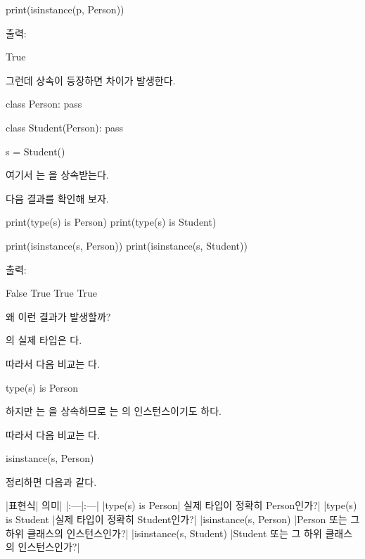 \begin{dhkcode}
print(isinstance(p, Person))
\end{dhkcode}

출력:

\begin{dhkzsh}
True
\end{dhkzsh}

그런데 상속이 등장하면 차이가 발생한다.

\begin{dhkcode}
class Person:
    pass

class Student(Person):
    pass

s = Student()
\end{dhkcode}

여기서 는 을 상속받는다.

다음 결과를 확인해 보자.

\begin{dhkcode}
print(type(s) is Person)
print(type(s) is Student)

print(isinstance(s, Person))
print(isinstance(s, Student))
\end{dhkcode}

출력:

\begin{dhkzsh}
False
True
True
True
\end{dhkzsh}

왜 이런 결과가 발생할까?

의 실제 타입은 다.

따라서 다음 비교는 다.

\begin{dhkcode}
type(s) is Person
\end{dhkcode}

하지만 는 을 상속하므로 는 의 인스턴스이기도 하다.

따라서 다음 비교는 다.

\begin{dhkcode}
isinstance(s, Person)
\end{dhkcode}

정리하면 다음과 같다.

\begin{dhktable}
|표현식|	의미|
|:---|:---|
|type(s) is Person|	실제 타입이 정확히 Person인가?|
|type(s) is Student	|실제 타입이 정확히 Student인가?|
|isinstance(s, Person)	|Person 또는 그 하위 클래스의 인스턴스인가?|
|isinstance(s, Student)	|Student 또는 그 하위 클래스의 인스턴스인가?|
\end{dhktable}

